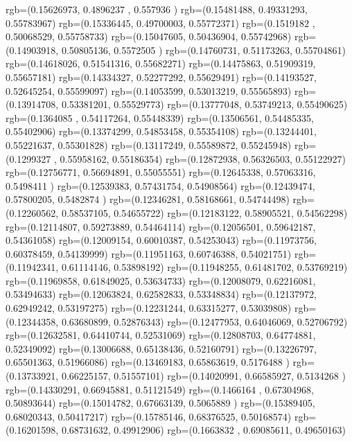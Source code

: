 {{{		  rgb=(0.15626973,  0.4896237 ,  0.557936  )
		  rgb=(0.15481488,  0.49331293,  0.55783967)
		  rgb=(0.15336445,  0.49700003,  0.55772371)
		  rgb=(0.1519182 ,  0.50068529,  0.55758733)
		  rgb=(0.15047605,  0.50436904,  0.55742968)
		  rgb=(0.14903918,  0.50805136,  0.5572505 )
		  rgb=(0.14760731,  0.51173263,  0.55704861)
		  rgb=(0.14618026,  0.51541316,  0.55682271)
		  rgb=(0.14475863,  0.51909319,  0.55657181)
		  rgb=(0.14334327,  0.52277292,  0.55629491)
		  rgb=(0.14193527,  0.52645254,  0.55599097)
		  rgb=(0.14053599,  0.53013219,  0.55565893)
		  rgb=(0.13914708,  0.53381201,  0.55529773)
		  rgb=(0.13777048,  0.53749213,  0.55490625)
		  rgb=(0.1364085 ,  0.54117264,  0.55448339)
		  rgb=(0.13506561,  0.54485335,  0.55402906)
		  rgb=(0.13374299,  0.54853458,  0.55354108)
		  rgb=(0.13244401,  0.55221637,  0.55301828)
		  rgb=(0.13117249,  0.55589872,  0.55245948)
		  rgb=(0.1299327 ,  0.55958162,  0.55186354)
		  rgb=(0.12872938,  0.56326503,  0.55122927)
		  rgb=(0.12756771,  0.56694891,  0.55055551)
		  rgb=(0.12645338,  0.57063316,  0.5498411 )
		  rgb=(0.12539383,  0.57431754,  0.54908564)
		  rgb=(0.12439474,  0.57800205,  0.5482874 )
		  rgb=(0.12346281,  0.58168661,  0.54744498)
		  rgb=(0.12260562,  0.58537105,  0.54655722)
		  rgb=(0.12183122,  0.58905521,  0.54562298)
		  rgb=(0.12114807,  0.59273889,  0.54464114)
		  rgb=(0.12056501,  0.59642187,  0.54361058)
		  rgb=(0.12009154,  0.60010387,  0.54253043)
		  rgb=(0.11973756,  0.60378459,  0.54139999)
		  rgb=(0.11951163,  0.60746388,  0.54021751)
		  rgb=(0.11942341,  0.61114146,  0.53898192)
		  rgb=(0.11948255,  0.61481702,  0.53769219)
		  rgb=(0.11969858,  0.61849025,  0.53634733)
		  rgb=(0.12008079,  0.62216081,  0.53494633)
		  rgb=(0.12063824,  0.62582833,  0.53348834)
		  rgb=(0.12137972,  0.62949242,  0.53197275)
		  rgb=(0.12231244,  0.63315277,  0.53039808)
		  rgb=(0.12344358,  0.63680899,  0.52876343)
		  rgb=(0.12477953,  0.64046069,  0.52706792)
		  rgb=(0.12632581,  0.64410744,  0.52531069)
		  rgb=(0.12808703,  0.64774881,  0.52349092)
		  rgb=(0.13006688,  0.65138436,  0.52160791)
		  rgb=(0.13226797,  0.65501363,  0.51966086)
		  rgb=(0.13469183,  0.65863619,  0.5176488 )
		  rgb=(0.13733921,  0.66225157,  0.51557101)
		  rgb=(0.14020991,  0.66585927,  0.5134268 )
		  rgb=(0.14330291,  0.66945881,  0.51121549)
		  rgb=(0.1466164 ,  0.67304968,  0.50893644)
		  rgb=(0.15014782,  0.67663139,  0.5065889 )
		  rgb=(0.15389405,  0.68020343,  0.50417217)
		  rgb=(0.15785146,  0.68376525,  0.50168574)
		  rgb=(0.16201598,  0.68731632,  0.49912906)
		  rgb=(0.1663832 ,  0.69085611,  0.49650163)
}}}
